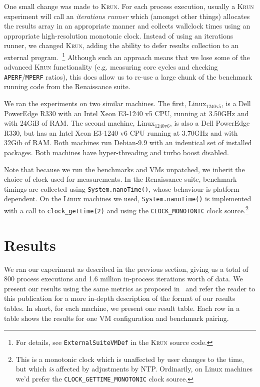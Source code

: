 \documentclass[a4paper]{article}
\newcommand{\krun}{\textsc{Krun}\xspace}
\newcommand{\bencherseven}{Linux$_\mathrm{1240v5}$\xspace}
\newcommand{\bencherten}{Linux$_\mathrm{1240v6}$\xspace}
\begin{document}
One small change was made to \krun. For each process execution, usually a
\krun experiment will call an \emph{iterations runner} which (amongst other
things) allocates the results array in an appropriate manner and collects
wallclock times using an appropriate high-resolution monotonic clock. Instead
of using an iterations runner, we changed \krun, adding the ability to defer
results collection to an external program.~\footnote{For details, see
\texttt{ExternalSuiteVMDef} in the \krun source code.} Although such an approach
means that we lose some of the advanced \krun functionality (e.g.
measuring core cycles and checking \texttt{APERF}/\texttt{MPERF} ratios), this
does allow us to re-use a large chunk of the benchmark running code from the
Renaissance suite.

We ran the experiments on two similar machines. The first, \bencherseven, is a
Dell PowerEdge R330 with an Intel Xeon E3-1240 v5 CPU, running at 3.50GHz and
with 24GiB of RAM. The second machine, \bencherten, is also a Dell PowerEdge
R330, but has an Intel Xeon E3-1240 v6 CPU running at 3.70GHz
and with 32Gib of RAM. Both machines run Debian-9.9 with an indentical set of
installed packages. Both machines have hyper-threading and turbo boost
disabled.

Note that because we run the benchmarks and VMs unpatched, we inherit the
choice of clock used for measurements. In the Renaissance suite, benchmark
timings are collected using \texttt{System.nanoTime()}, whose behaviour is
platform dependent. On the Linux machines we used, \texttt{System.nanoTime()}
is implemented with a call to \texttt{clock\_gettime(2)} and using the
\texttt{CLOCK\_MONOTONIC} clock source.\footnote{This is a monotonic clock which
is unaffected by user changes to the time, but which \emph{is} affected by
adjustments by NTP. Ordinarily, on Linux machines we'd prefer the
\texttt{CLOCK\_GETTIME\_MONOTONIC} clock source.}



\section{Results}
\label{sec:results}

We ran our experiment as described in the previous section, giving us a total
of 800 process executions and 1.6 million in-process iterations worth of data.
We present our results using the same metrics as proposed
in~\cite{barrett16warmup} and refer the reader to this publication for a more
in-depth description of the format of our results tables. In short, for each
machine, we present one result table. Each row in a table shows the results for
one VM configuration and benchmark pairing.
\end{document}

